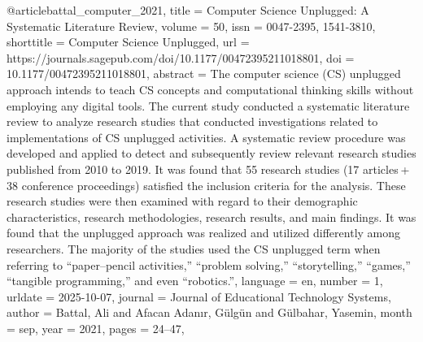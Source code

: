 @article{battal_computer_2021,
	title = {Computer {Science} {Unplugged}: {A} {Systematic} {Literature} {Review}},
	volume = {50},
	issn = {0047-2395, 1541-3810},
	shorttitle = {Computer {Science} {Unplugged}},
	url = {https://journals.sagepub.com/doi/10.1177/00472395211018801},
	doi = {10.1177/00472395211018801},
	abstract = {The computer science (CS) unplugged approach intends to teach CS concepts and computational thinking skills 
without employing any digital tools. The current study conducted a systematic literature review to analyze research studies that 
conducted investigations related to implementations of CS unplugged activities. A systematic review procedure was developed and 
applied to detect and subsequently review relevant research studies published from 2010 to 2019. It was found that 55 research 
studies (17 articles + 38 conference proceedings) satisfied the inclusion criteria for the analysis. These research studies were 
then examined with regard to their demographic characteristics, research methodologies, research results, and main findings. It 
was found that the unplugged approach was realized and utilized differently among researchers. The majority of the studies used 
the CS unplugged term when referring to “paper–pencil activities,” “problem solving,” “storytelling,” “games,” “tangible 
programming,” and even “robotics.”},
	language = {en},
	number = {1},
	urldate = {2025-10-07},
	journal = {Journal of Educational Technology Systems},
	author = {Battal, Ali and Afacan Adanır, Gülgün and Gülbahar, Yasemin},
	month = sep,
	year = {2021},
	pages = {24--47},
}

